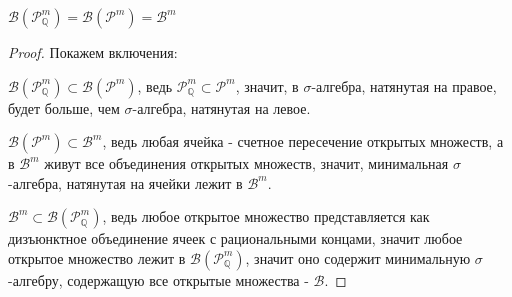 \begin{consequence} \thmslashn

  $\mathcal{B}(\mathcal{P}_{\mathbb{Q}}^m) = \mathcal{B}(\mathcal{P}^m) = \mathcal{B}^m$
  \begin{proof} \thmslashn

    Покажем включения:

    $\mathcal{B}(\mathcal{P}_{\mathbb{Q}}^m) \subset \mathcal{B}(\mathcal{P}^m)$, ведь $\mathcal{P}_{\mathbb{Q}}^m\subset\mathcal{P}^m$, значит, в $\sigma$-алгебра, натянутая на правое, будет больше, чем $\sigma$-алгебра, натянутая на левое.

    $\mathcal{B}(\mathcal{P}^m) \subset \mathcal{B}^m$, ведь любая ячейка - счетное пересечение открытых множеств, а в $\mathcal{B}^m$ живут все объединения открытых множеств, значит, минимальная $\sigma$-алгебра, натянутая на ячейки лежит в $\mathcal{B}^m$.

    $\mathcal{B}^m \subset \mathcal{B}(\mathcal{P}_{\mathbb{Q}}^m)$, ведь любое открытое множество представляется как дизъюнктное объединение ячеек с рациональными концами, значит любое открытое множество лежит в $\mathcal{B}(\mathcal{P}_{\mathbb{Q}}^m)$, значит оно содержит минимальную $\sigma$-алгебру, содержащую все открытые множества - $\mathcal{B}$.
  \end{proof}
\end{consequence}
